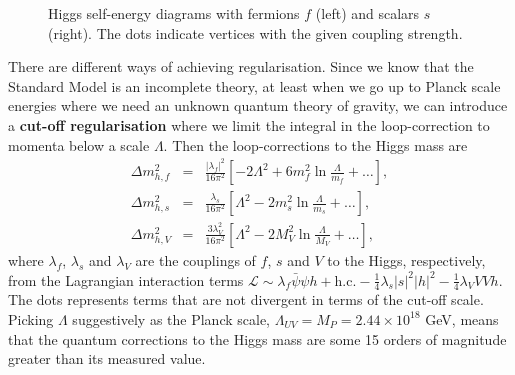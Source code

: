 \documentclass[notes.tex]{subfiles}
\begin{document}
\begin{figure}
\centering
{}
\caption{Higgs self-energy diagrams with fermions $f$ (left) and scalars $s$ (right). The dots indicate vertices with the given coupling strength.}  
\label{fig:hierarchy}
\end{figure}

There are different ways of achieving regularisation. Since we know that the Standard Model is an incomplete theory, at least when we go up to Planck scale energies where we need an unknown quantum theory of gravity, we can introduce a {\bf cut-off regularisation} where we limit the integral in the loop-correction to momenta below a scale $\Lambda$. Then the loop-corrections to the Higgs mass are
\begin{eqnarray}
\Delta m_{h,f}^2 &=& \frac{|\lambda_f|^2}{16\pi^2}\left[-2\Lambda^2 +6m_f^2\ln\frac{\Lambda}{m_f}+\ldots \right], \label{eq:higgsqdiv} \\
\Delta m_{h,s}^2 &=&  \frac{\lambda_s}{16\pi^2}\left[\Lambda^2 -2m_s^2\ln\frac{\Lambda}{m_s}+\ldots\right],  \\
\Delta m_{h,V}^2 &=& \frac{3\lambda_V^2}{16\pi^2}\left[\Lambda^2 - 2M_V^2\ln\frac{\Lambda}{M_V}+\ldots \right],
\end{eqnarray}
where $\lambda_f$, $\lambda_s$ and $\lambda_V$ are the couplings of $f$, $s$ and $V$ to the Higgs, respectively, from the Lagrangian interaction terms $\mathcal L \sim \lambda_f \bar\psi\psi h+\text{h.c.}-\frac{1}{4}\lambda_s |s|^2 |h|^2-\frac{1}{4}\lambda_V VV h$. The dots represents terms that are not divergent in terms of the cut-off scale.
Picking $\Lambda$  suggestively as the Planck scale, $\Lambda_{UV} =M_P = 2.44\times 10^{18}$ GeV, means that the quantum corrections to the Higgs mass are some 15 orders of magnitude greater than its measured value. 
\end{document}
